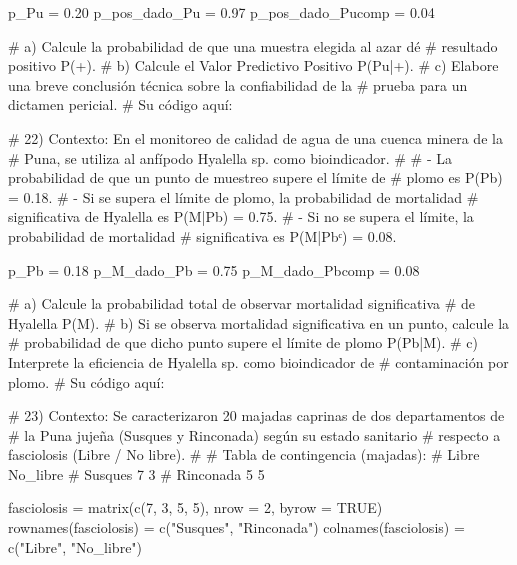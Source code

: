 \documentclass[
  spanish,
  letterpaper,
  DIV=11,
  numbers=noendperiod]{scrreprt}
\newenvironment{Shaded}{\begin{snugshade}}{\end{snugshade}}
\newcommand{\AttributeTok}[1]{\textcolor[rgb]{0.40,0.45,0.13}{#1}}
\newcommand{\CommentTok}[1]{\textcolor[rgb]{0.37,0.37,0.37}{#1}}
\newcommand{\ConstantTok}[1]{\textcolor[rgb]{0.56,0.35,0.01}{#1}}
\newcommand{\DecValTok}[1]{\textcolor[rgb]{0.68,0.00,0.00}{#1}}
\newcommand{\FloatTok}[1]{\textcolor[rgb]{0.68,0.00,0.00}{#1}}
\newcommand{\FunctionTok}[1]{\textcolor[rgb]{0.28,0.35,0.67}{#1}}
\newcommand{\NormalTok}[1]{\textcolor[rgb]{0.00,0.23,0.31}{#1}}
\newcommand{\OtherTok}[1]{\textcolor[rgb]{0.00,0.23,0.31}{#1}}
\newcommand{\StringTok}[1]{\textcolor[rgb]{0.13,0.47,0.30}{#1}}
\begin{document}
\begin{Shaded}
\begin{Highlighting}[]
\NormalTok{p\_Pu }\OtherTok{=} \FloatTok{0.20}
\NormalTok{p\_pos\_dado\_Pu }\OtherTok{=} \FloatTok{0.97}
\NormalTok{p\_pos\_dado\_Pucomp }\OtherTok{=} \FloatTok{0.04}

\CommentTok{\#     a) Calcule la probabilidad de que una muestra elegida al azar dé}
\CommentTok{\#        resultado positivo P(+).}
\CommentTok{\#     b) Calcule el Valor Predictivo Positivo P(Pu|+).}
\CommentTok{\#     c) Elabore una breve conclusión técnica sobre la confiabilidad de la}
\CommentTok{\#        prueba para un dictamen pericial.}
\CommentTok{\# Su código aquí:}


\CommentTok{\# 22) Contexto: En el monitoreo de calidad de agua de una cuenca minera de la}
\CommentTok{\#     Puna, se utiliza al anfípodo Hyalella sp. como bioindicador.}
\CommentTok{\#}
\CommentTok{\#     {-} La probabilidad de que un punto de muestreo supere el límite de}
\CommentTok{\#       plomo es P(Pb) = 0.18.}
\CommentTok{\#     {-} Si se supera el límite de plomo, la probabilidad de mortalidad}
\CommentTok{\#       significativa de Hyalella es P(M|Pb) = 0.75.}
\CommentTok{\#     {-} Si no se supera el límite, la probabilidad de mortalidad}
\CommentTok{\#       significativa es P(M|Pbᶜ) = 0.08.}

\NormalTok{p\_Pb }\OtherTok{=} \FloatTok{0.18}
\NormalTok{p\_M\_dado\_Pb }\OtherTok{=} \FloatTok{0.75}
\NormalTok{p\_M\_dado\_Pbcomp }\OtherTok{=} \FloatTok{0.08}

\CommentTok{\#     a) Calcule la probabilidad total de observar mortalidad significativa}
\CommentTok{\#        de Hyalella P(M).}
\CommentTok{\#     b) Si se observa mortalidad significativa en un punto, calcule la}
\CommentTok{\#        probabilidad de que dicho punto supere el límite de plomo P(Pb|M).}
\CommentTok{\#     c) Interprete la eficiencia de Hyalella sp. como bioindicador de}
\CommentTok{\#        contaminación por plomo.}
\CommentTok{\# Su código aquí:}


\CommentTok{\# 23) Contexto: Se caracterizaron 20 majadas caprinas de dos departamentos de}
\CommentTok{\#     la Puna jujeña (Susques y Rinconada) según su estado sanitario}
\CommentTok{\#     respecto a fasciolosis (Libre / No libre).}
\CommentTok{\#}
\CommentTok{\#     Tabla de contingencia (majadas):}
\CommentTok{\#                  Libre   No\_libre}
\CommentTok{\#     Susques        7         3}
\CommentTok{\#     Rinconada      5         5}

\NormalTok{fasciolosis }\OtherTok{=} \FunctionTok{matrix}\NormalTok{(}\FunctionTok{c}\NormalTok{(}\DecValTok{7}\NormalTok{, }\DecValTok{3}\NormalTok{, }\DecValTok{5}\NormalTok{, }\DecValTok{5}\NormalTok{), }\AttributeTok{nrow =} \DecValTok{2}\NormalTok{, }\AttributeTok{byrow =} \ConstantTok{TRUE}\NormalTok{)}
\FunctionTok{rownames}\NormalTok{(fasciolosis) }\OtherTok{=} \FunctionTok{c}\NormalTok{(}\StringTok{"Susques"}\NormalTok{, }\StringTok{"Rinconada"}\NormalTok{)}
\FunctionTok{colnames}\NormalTok{(fasciolosis) }\OtherTok{=} \FunctionTok{c}\NormalTok{(}\StringTok{"Libre"}\NormalTok{, }\StringTok{"No\_libre"}\NormalTok{)}


\end{Highlighting}
\end{Shaded}
\end{document}
